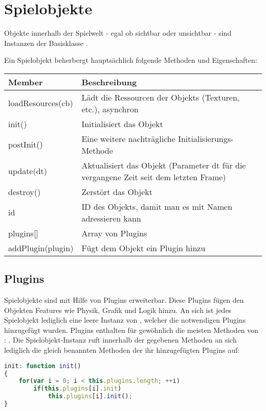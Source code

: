 \chapter{Spielobjekte}

Objekte innerhalb der Spielwelt - egal ob sichtbar oder unsichtbar - sind Instanzen der Basisklasse . 

Ein Spielobjekt beherbergt hauptsächlich folgende Methoden und Eigenschaften:

\begin{tabular}{|l|l|}
\hline 
Member & Beschreibung \\ 
\hline 
loadResources(cb) & Lädt die Ressourcen der Objekts (Texturen, etc.), asynchron \\ 
\hline 
init() & Initialisiert das Objekt \\ 
\hline 
postInit() & Eine weitere nachträgliche Initialisierungs-Methode \\ 
\hline 
update(dt) & Aktualisiert das Objekt (Parameter dt für die vergangene Zeit seit dem letzten Frame) \\ 
\hline 
destroy() & Zerstört das Objekt \\ 
\hline
id & ID des Objekts, damit man es mit Namen adressieren kann \\
\hline
plugins[] & Array von Plugins \\
\hline
addPlugin(plugin) & Fügt dem Objekt ein Plugin hinzu \\
\hline 
\end{tabular} 

\section{Plugins}

Spielobjekte sind mit Hilfe von Plugins erweiterbar. Diese Plugins fügen den Objekten Features wie Physik, Grafik und Logik hinzu. An sich ist jedes Spielobjekt lediglich eine leere Instanz von , welcher die notwendigen Plugins hinzugefügt wurden. Plugins enthalten für gewöhnlich die meisten Methoden von : . Die Spielobjekt-Instanz ruft innerhalb der gegebenen Methoden an sich lediglich die gleich benannten Methoden der ihr hinzugefügten Plugins auf:

\begin{lstlisting}[language=JavaScript]
init: function init()
{
	for(var i = 0; i < this.plugins.length; ++i)
		if(this.plugins[i].init)
			this.plugins[i].init();
}
\end{lstlisting}

